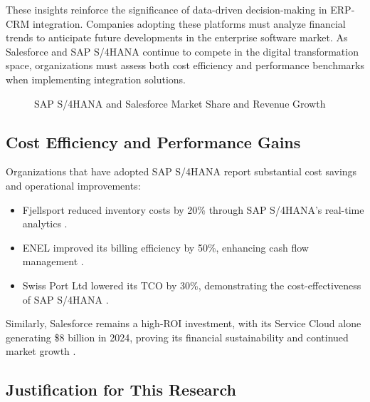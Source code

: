 These insights reinforce the significance of data-driven decision-making in ERP-CRM integration. Companies adopting these platforms must analyze financial trends to anticipate future developments in the enterprise software market. As Salesforce and SAP S/4HANA continue to compete in the digital transformation space, organizations must assess both cost efficiency and performance benchmarks when implementing integration solutions.

\begin{figure}[H]
    \centering
    \caption{SAP S/4HANA and Salesforce Market Share and Revenue Growth}
    \label{fig:salesforce_revenue}
\end{figure}


\subsection{Cost Efficiency and Performance Gains}
Organizations that have adopted SAP S/4HANA report substantial cost savings and operational improvements:
\begin{itemize}
    \item Fjellsport reduced inventory costs by 20\% through SAP S/4HANA’s real-time analytics \cite{sap_2025}.
    \item ENEL improved its billing efficiency by 50\%, enhancing cash flow management \cite{sap_2025}.
    \item Swiss Port Ltd lowered its TCO by 30\%, demonstrating the cost-effectiveness of SAP S/4HANA \cite{sap_2025}.
\end{itemize}

Similarly, Salesforce remains a high-ROI investment, with its Service Cloud alone generating \$8 billion in 2024, proving its financial sustainability and continued market growth \cite{statista_2023b}.


\subsection{Justification for This Research}

